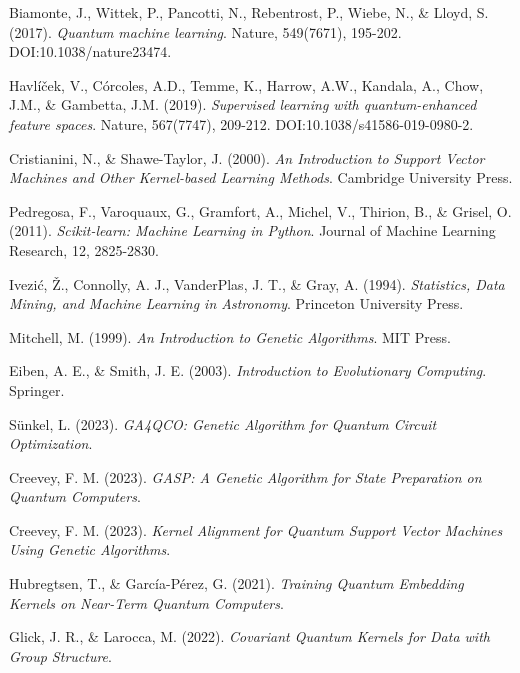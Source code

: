 \documentclass[12pt]{article}
\begin{document}
\begin{thebibliography}{9}

Biamonte, J., Wittek, P., Pancotti, N., Rebentrost, P., Wiebe, N., \& Lloyd, S. (2017). \textit{Quantum machine learning}. Nature, 549(7671), 195-202. DOI:10.1038/nature23474.

Havlíček, V., Córcoles, A.D., Temme, K., Harrow, A.W., Kandala, A., Chow, J.M., \& Gambetta, J.M. (2019). \textit{Supervised learning with quantum-enhanced feature spaces}. Nature, 567(7747), 209-212. DOI:10.1038/s41586-019-0980-2.

Cristianini, N., \& Shawe-Taylor, J. (2000). \textit{An Introduction to Support Vector Machines and Other Kernel-based Learning Methods}. Cambridge University Press.
    
Pedregosa, F., Varoquaux, G., Gramfort, A., Michel, V., Thirion, B., \& Grisel, O. (2011). \textit{Scikit-learn: Machine Learning in Python}. Journal of Machine Learning Research, 12, 2825-2830.


    Ivezić, Ž., Connolly, A. J., VanderPlas, J. T., \& Gray, A. (1994). \textit{Statistics, Data Mining, and Machine Learning in Astronomy}. Princeton University Press.
    
    Mitchell, M. (1999). \textit{An Introduction to Genetic Algorithms}. MIT Press.
    
    Eiben, A. E., \& Smith, J. E. (2003). \textit{Introduction to Evolutionary Computing}. Springer.
    
    Sünkel, L. (2023). \textit{GA4QCO: Genetic Algorithm for Quantum Circuit Optimization}.
    
    Creevey, F. M. (2023). \textit{GASP: A Genetic Algorithm for State Preparation on Quantum Computers}.
    
    Creevey, F. M. (2023). \textit{Kernel Alignment for Quantum Support Vector Machines Using Genetic Algorithms}.
    
    Hubregtsen, T., \& García-Pérez, G. (2021). \textit{Training Quantum Embedding Kernels on Near-Term Quantum Computers}.
    
    Glick, J. R., \& Larocca, M. (2022). \textit{Covariant Quantum Kernels for Data with Group Structure}.
    

\end{thebibliography}
\end{document}
